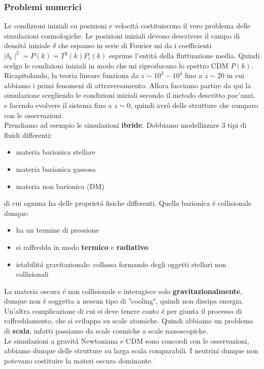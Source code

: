 \documentclass[12pt, a4paper]{article}
\begin{document}
\subsubsection{Problemi numerici}
Le condizioni iniziali su posizioni e velocit\'{a} costituiscono il vero problema delle simulazioni cosmologiche. Le posizioni iniziali devono descrivere il campo di densit\'{a} iniziale $\delta$ che espanso in serie di Fourier mi da i coefficienti $\mid \delta_k\mid^2=P(k)=T^2(k)P_i(k)$ esprime l'entit\'{a} della fluttuazione media. Quindi scelgo le condizioni iniziali in modo che mi riproducano lo spettro CDM $P(k)$.\\
Ricapitolando, la teoria lineare funziona da $z\sim 10^3-10^4$ fino a $z\sim 20$ in cui abbiamo i primi fenomeni di attraversamento. Allora facciamo partire da qui la simulazione scegliendo le condizioni iniziali secondo il metodo descritto poc'anzi, e facendo evolvere il sistema fino a $z\sim 0$, quindi avr\'{o} delle strutture che comparo con le osservazioni.\\
Prendiamo ad esempio le simulazioni \textbf{ibride}. Dobbiamo modellizzare 3 tipi di fluidi differenti:
\begin{itemize}
\item materia barionica stellare
\item materia barionica gassosa
\item materia non barionica (DM)
\end{itemize}
di cui ognuna ha delle propriet\'{a} fisiche differenti. Quella barionica \'{e} collisionale dunque:
\begin{itemize}
\item ha un termine di pressione
\item si raffredda in modo \textbf{termico} e \textbf{radiativo}
\item istabilit\'{a} gravitazionale: collassa formando degli oggetti stellari non collisionali
\end{itemize}
La materia oscura \'{e} non collisionale e interagisce solo \textbf{gravitazionalmente}, dunque non \'{e} soggetta a nessun tipo di "cooling", quindi non dissipa energia. Un'altra complicazione di cui si deve tenere conto \'{e} per giunta il processo di raffreddamento, che si sviluppa su scale atomiche. Quindi abbiamo un problema di \textbf{scala}, infatti passiamo da scale cosmiche a scale nanoscopiche.\\
Le simulazioni a gravit\'{a} Newtoniana e CDM sono concordi con le osservazioni, abbiamo dunque delle strutture su larga scala comparabili. I neutrini dunque non potevano costituire la materi oscura dominante.
\newpage
\end{document}
